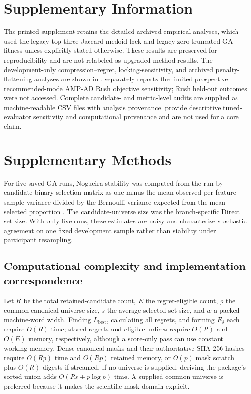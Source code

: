 \clearpage
\supplementarysetup
\section*{Supplementary Information}

The printed supplement retains the detailed archived empirical analyses, which used the legacy top-three Jaccard-medoid lock and legacy zero-truncated GA fitness unless explicitly stated otherwise. These results are preserved for reproducibility and are not relabeled as upgraded-method results. The development-only compression--regret, locking-sensitivity, and archived penalty-flattening analyses are shown in .  separately reports the limited prospective recommended-mode AMP-AD Rush objective sensitivity; Rush held-out outcomes were not accessed. Complete candidate- and metric-level audits are supplied as machine-readable CSV files with analysis provenance.  provide descriptive tuned-evaluator sensitivity and computational provenance and are not used for a core claim.


\section{Supplementary Methods}

For five saved GA runs, Nogueira stability was computed from the run-by-candidate binary selection matrix as one minus the mean observed per-feature sample variance divided by the Bernoulli variance expected from the mean selected proportion \citep{ref36}. The candidate-universe size was the branch-specific Direct set size. With only five runs, these estimates are noisy and characterize stochastic agreement on one fixed development sample rather than stability under participant resampling.



\subsection{Computational complexity and implementation correspondence}

Let $R$ be the total retained-candidate count, $E$ the regret-eligible count, $p$ the common canonical-universe size, $s$ the average selected-set size, and $w$ a packed machine-word width. Finding $L_{\mathrm{best}}$, calculating all regrets, and forming $E_\delta$ each require $O(R)$ time; stored regrets and eligible indices require $O(R)$ and $O(E)$ memory, respectively, although a score-only pass can use constant working memory. Dense canonical masks and their authoritative SHA-256 hashes require $O(Rp)$ time and $O(Rp)$ retained memory, or $O(p)$ mask scratch plus $O(R)$ digests if streamed. If no universe is supplied, deriving the package's sorted union adds $O(Rs+p\log p)$ time. A supplied common universe is preferred because it makes the scientific mask domain explicit.


